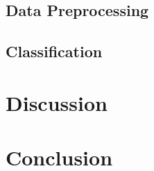\documentclass[conference]{IEEEtran}
\begin{document}
\subsection{Data Preprocessing}

\subsection{Classification}

\section{Discussion}

\section{Conclusion}



\end{document}
